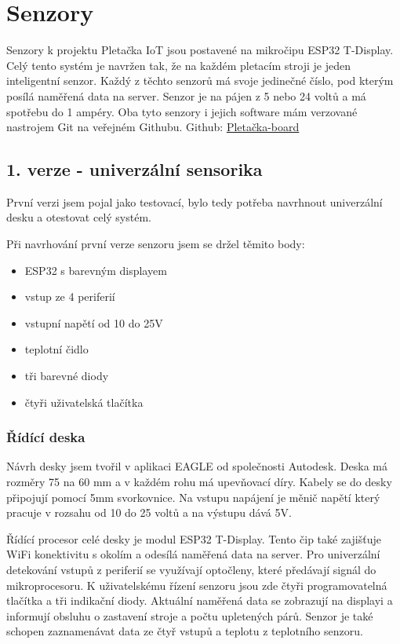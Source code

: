 \chapter{Senzory}

Senzory k projektu Pletačka IoT jsou postavené na mikročipu ESP32 T-Display\cite{ESP32}.
Celý tento systém je navržen tak, že na každém pletacím stroji je jeden inteligentní senzor.
Každý z těchto senzorů má svoje jedinečné číslo, pod kterým posílá naměřená data na server.
Senzor je na pájen z 5 nebo 24 voltů a má spotřebu do 1 ampéry.
Oba tyto senzory i jejich software mám verzované nastrojem Git na veřejném Githubu.\newline
Github: \href{https://github.com/Pletacka-IoT/Pletacka-board}{Pletačka-board} 

\section{1. verze - univerzální sensorika}

První verzi jsem pojal jako testovací, bylo tedy potřeba navrhnout univerzální desku a otestovat celý systém.\newline

Při navrhování první verze senzoru jsem se držel těmito body:
\begin{itemize}
    \item ESP32 s barevným displayem
    \item vstup ze 4 periferií
    \item vstupní napětí od 10 do 25V
    \item teplotní čidlo
    \item tři barevné diody
    \item čtyři uživatelská tlačítka
\end{itemize}


\subsection{Řídící deska}
Návrh desky jsem tvořil v aplikaci EAGLE od společnosti Autodesk. 
Deska má rozměry 75 na 60 mm a v každém rohu má upevňovací díry. 
Kabely se do desky připojují pomocí 5mm svorkovnice.
Na vstupu napájení je měnič napětí který pracuje v rozsahu od 10 do 25 voltů a na výstupu dává 5V. 

Řídící procesor celé desky je modul ESP32 T-Display.
Tento čip také zajišťuje WiFi konektivitu s okolím a odesílá naměřená data na server.
Pro univerzální detekování vstupů z periferií se využívají optočleny, které předávají signál do mikroprocesoru.
\fxnote[author=JA]{\textcolor{mygreen}{Optočlen}}
K uživatelskému řízení senzoru jsou zde čtyři programovatelná tlačítka a tři indikační diody.
Aktuální naměřená data se zobrazují na displayi a informují obsluhu o zastavení stroje a počtu upletených párů.
Senzor je také schopen zaznamenávat data ze čtyř vstupů a teplotu z teplotního senzoru.

